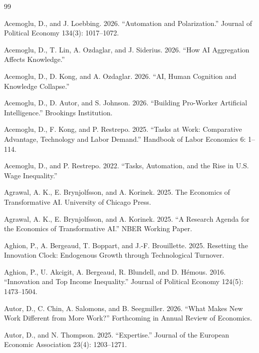 \documentclass{article}
\renewcommand{\emph}[1]{#1}
\begin{document}
\begin{thebibliography}{99}

Acemoglu, D., and J. Loebbing. 2026.
\newblock ``Automation and Polarization.''
\newblock \emph{Journal of Political Economy} 134(3): 1017--1072.

Acemoglu, D., T. Lin, A. Ozdaglar, and J. Siderius. 2026.
\newblock ``How AI Aggregation Affects Knowledge.''

Acemoglu, D., D. Kong, and A. Ozdaglar. 2026.
\newblock ``AI, Human Cognition and Knowledge Collapse.''

Acemoglu, D., D. Autor, and S. Johnson. 2026.
\newblock ``Building Pro-Worker Artificial Intelligence.''
\newblock Brookings Institution.

Acemoglu, D., F. Kong, and P. Restrepo. 2025.
\newblock ``Tasks at Work: Comparative Advantage, Technology and Labor Demand.''
\newblock \emph{Handbook of Labor Economics} 6: 1--114.

Acemoglu, D., and P. Restrepo. 2022.
\newblock ``Tasks, Automation, and the Rise in U.S. Wage Inequality.''

Agrawal, A. K., E. Brynjolfsson, and A. Korinek. 2025.
\newblock \emph{The Economics of Transformative AI}.
\newblock University of Chicago Press.

Agrawal, A. K., E. Brynjolfsson, and A. Korinek. 2025.
\newblock ``A Research Agenda for the Economics of Transformative AI.''
\newblock NBER Working Paper.

Aghion, P., A. Bergeaud, T. Boppart, and J.-F. Brouillette. 2025.
\newblock \emph{Resetting the Innovation Clock: Endogenous Growth through Technological Turnover}.

Aghion, P., U. Akcigit, A. Bergeaud, R. Blundell, and D. H\'emous. 2016.
\newblock ``Innovation and Top Income Inequality.''
\newblock \emph{Journal of Political Economy} 124(5): 1473--1504.

Autor, D., C. Chin, A. Salomons, and B. Seegmiller. 2026.
\newblock ``What Makes New Work Different from More Work?''
\newblock Forthcoming in \emph{Annual Review of Economics}.

Autor, D., and N. Thompson. 2025.
\newblock ``Expertise.''
\newblock \emph{Journal of the European Economic Association} 23(4): 1203--1271.


\end{thebibliography}
\end{document}
